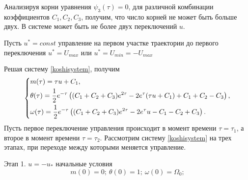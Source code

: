 \documentclass[a4paper,14pt]{article}
\theoremstyle{plain} %
\theoremstyle{definition} %
\theoremstyle{remark} %
\begin{document}
{Анализируя корни уравнения $\psi_3(\tau)=0$, для различной комбинации
коэффициентов $C_1,C_2,C_3$, получим, что число корней не может быть больше двух. В системе может быть не более двух переключений $u$.

Пусть $u^*=const$ управление на первом участке траектории до первого переключения $u^*=U_{max}$ или $u^*=U_{min}=-U_{max}$

Решая систему \eqref{koshisystem}, получим
\begin{equation}\label{solvekoshi}
    \left\{ {\begin{aligned}
                 & m(\tau) = \tau u+C_1, \hfill                                                            \\
                 & \theta(\tau) = \frac{1}{2} e^{-\tau } \left((C_1+C_2+C_3) e^{2 \tau }-2 e^{\tau } (\tau
                u+C_1)+C_1+C_2-C_3\right), \hfill                                                          \\
                 & \omega(\tau) = \frac{1}{2} e^{-\tau } \left((C_1+C_2+C_3) e^{2 \tau }-2 e^{\tau }
                u-C_1-C_2+C_3\right). \hfill                                                               \\
            \end{aligned}} \right.
\end{equation}
Пусть первое переключение управления происходит в момент времени
$\tau=\tau_1$, а второе в момент времени
$\tau=\tau_2$. Рассмотрим систему \eqref{koshisystem} на трех этапах,
при переходе между которыми меняется управление.

Этап 1. $u=-u_*$ начальные условия
\[
    m(0)=0;\ \theta(0)=1;\ \omega(0)=\Omega_0;
\]

}
\end{document}

